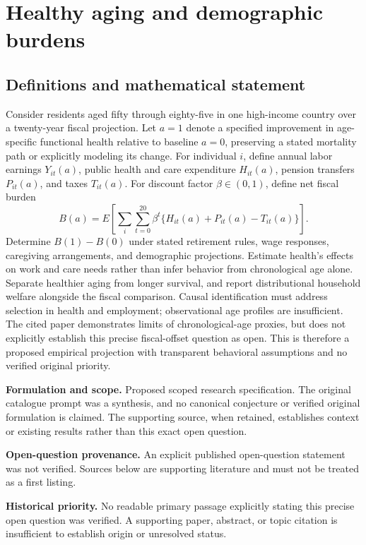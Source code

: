 \documentclass[11pt]{article}
\begin{document}
\section*{Healthy aging and demographic burdens}\label{30007741}
\subsection{Definitions and mathematical statement}
Consider residents aged fifty through eighty-five in one high-income country over a twenty-year fiscal projection. Let \(a=1\) denote a specified improvement in age-specific functional health relative to baseline \(a=0\), preserving a stated mortality path or explicitly modeling its change. For individual \(i\), define annual labor earnings \(Y_{it}(a)\), public health and care expenditure \(H_{it}(a)\), pension transfers \(P_{it}(a)\), and taxes \(T_{it}(a)\). For discount factor \(\beta\in(0,1)\), define net fiscal burden
\[B(a)=E\!\left[\sum_i\sum_{t=0}^{20}\beta^t\{H_{it}(a)+P_{it}(a)-T_{it}(a)\}\right].\]
Determine \(B(1)-B(0)\) under stated retirement rules, wage responses, caregiving arrangements, and demographic projections. Estimate health’s effects on work and care needs rather than infer behavior from chronological age alone. Separate healthier aging from longer survival, and report distributional household welfare alongside the fiscal comparison. Causal identification must address selection in health and employment; observational age profiles are insufficient. The cited paper demonstrates limits of chronological-age proxies, but does not explicitly establish this precise fiscal-offset question as open. This is therefore a proposed empirical projection with transparent behavioral assumptions and no verified original priority.

\par\textbf{Formulation and scope.} Proposed scoped research specification. The original catalogue prompt was a synthesis, and no canonical conjecture or verified original formulation is claimed. The supporting source, when retained, establishes context or existing results rather than this exact open question.

\par\textbf{Open-question provenance.} An explicit published open-question statement was not verified. Sources below are supporting literature and must not be treated as a first listing.

\par\textbf{Historical priority.} No readable primary passage explicitly stating this precise open question was verified. A supporting paper, abstract, or topic citation is insufficient to establish origin or unresolved status.
\end{document}
